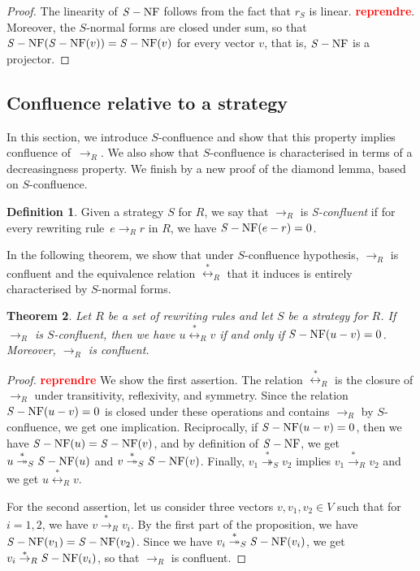 \documentclass[10pt]{easychair}
\newtheorem{theorem}{Theorem}[section]
\theoremstyle{definition}
\newtheorem{definition}[theorem]{Definition}
\newcommand\todo[1]{{\bf\textcolor{red}{#1}}}
\newcommand\rewR{\to_R}
\newcommand\transR{\overset{*}{\to}_R}
\newcommand\transS{\overset{*}{\twoheadrightarrow}_S}
\newcommand\equivR{\overset{*}{\leftrightarrow}_R}
\DeclareMathOperator{\SNF}{{\it S}-NF}
\begin{document}
\begin{proof}
  The linearity of $\SNF$ follows from the fact that $r_S$ is linear.
  \todo{reprendre}. Moreover, the $S$-normal forms are closed under sum,
  so that $\SNF(\SNF(v))=\SNF(v)$ for every vector $v$, that is, $\SNF$
  is a projector. 
\end{proof}

\subsection{Confluence relative to a strategy}
\label{sec:confluence_relative_to_a_strategy}

In this section, we introduce $S$-confluence and show that this property
implies confluence of~$\rewR$. We also show that $S$-confluence is
characterised in terms of a decreasingness property. We finish by a new
proof of the diamond lemma, based on $S$-confluence.
\smallskip

\begin{definition}\label{def:standardisation_property}
  Given a strategy $S$ for $R$, we say that $\rewR$ is \emph{S-confluent}
  if for every rewriting rule~$e\rewR r$ in $R$, we have $\SNF(e-r)=0$.
\end{definition}
\smallskip

In the following theorem, we show that under $S$-confluence hypothesis,
$\rewR$ is confluent and the equivalence relation $\equivR$ that it
induces is entirely characterised by $S$-normal forms. 
\medskip

\begin{theorem}\label{thm:S-confluence_criterion}
  Let $R$ be a set of rewriting rules and let $S$ be a strategy for $R$.
  If $\rewR$ is $S$-confluent, then we have $u\equivR v$ if and only if
  $\SNF(u-v)=0$. Moreover, $\rewR$ is confluent.
\end{theorem}

\begin{proof}
  \todo{reprendre}
  We show the first assertion. The relation $\equivR$ is the closure of
  $\rewR$ under transitivity, reflexivity, and symmetry. Since the
  relation $\SNF(u-v)=0$ is closed under these operations and contains
  $\rewR$ by $S$-confluence, we get one implication. Reciprocally, if
  $\SNF(u-v)=0$, then we have $\SNF(u)=\SNF(v)$, and by definition of
  $\SNF$, we get $u\transS\SNF(u)$ and $v\transS\SNF(v)$. Finally,
  $v_1\transS v_2$ implies $v_1\transR v_2$ and we get $u\equivR v$.

  For the second assertion, let us consider three vectors
  $v,v_1,v_2\in V$ such that for $i=1,2$, we have $v\transR v_i$. By the
  first part of the proposition, we have $\SNF(v_1)=\SNF(v_2)$. Since we
  have $v_i\transS\SNF(v_i)$, we get $v_i\transR\SNF(v_i)$, so that
  $\rewR$ is confluent.
\end{proof}
\smallskip
\end{document}
